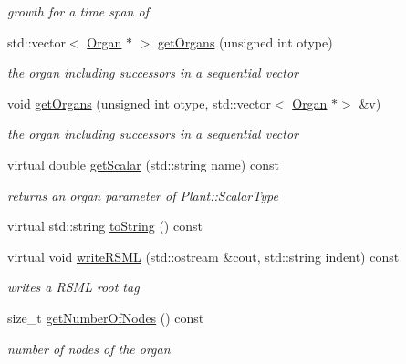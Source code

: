 \begin{DoxyCompactItemize}
\begin{DoxyCompactList}\small\item\em growth for a time span of \end{DoxyCompactList}\item 
std\+::vector$<$ \hyperlink{classCPlantBox_1_1Organ}{Organ} $\ast$ $>$ \hyperlink{classCPlantBox_1_1Organ_aee7e856229fd2ac996c0033aacead4c1}{get\+Organs} (unsigned int otype)
\begin{DoxyCompactList}\small\item\em the organ including successors in a sequential vector \end{DoxyCompactList}\item 
void \hyperlink{classCPlantBox_1_1Organ_a96e286dd479eca6b338630225939c636}{get\+Organs} (unsigned int otype, std\+::vector$<$ \hyperlink{classCPlantBox_1_1Organ}{Organ} $\ast$$>$ \&v)
\begin{DoxyCompactList}\small\item\em the organ including successors in a sequential vector \end{DoxyCompactList}\item 
virtual double \hyperlink{classCPlantBox_1_1Organ_adf7d115c625341e0f6d291c750b05e5c}{get\+Scalar} (std\+::string name) const
\begin{DoxyCompactList}\small\item\em returns an organ parameter of Plant\+::\+Scalar\+Type \end{DoxyCompactList}\item 
virtual std\+::string \hyperlink{classCPlantBox_1_1Organ_a9f823aebd19519096e899e65604f239f}{to\+String} () const
\item 
virtual void \hyperlink{classCPlantBox_1_1Organ_acdad546c90e915b61ac3606f1f841ba1}{write\+R\+S\+ML} (std\+::ostream \&cout, std\+::string indent) const
\begin{DoxyCompactList}\small\item\em writes a R\+S\+ML root tag \end{DoxyCompactList}\item 
\mbox{\label{classCPlantBox_1_1Organ_aa13c0f14d524c6fde4ee768b086f558f}} 
size\+\_\+t \hyperlink{classCPlantBox_1_1Organ_aa13c0f14d524c6fde4ee768b086f558f}{get\+Number\+Of\+Nodes} () const
\begin{DoxyCompactList}\small\item\em number of nodes of the organ \end{DoxyCompactList}\item 
$$
\end{DoxyCompactItemize}
